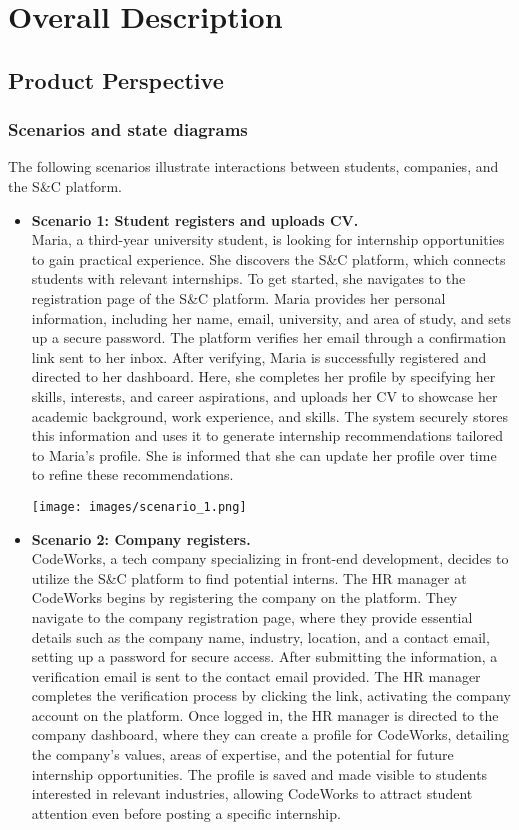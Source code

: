 \section{Overall Description}
\subsection{Product Perspective}


\subsubsection{Scenarios and state diagrams}
The following scenarios illustrate interactions between students, companies, and the S\&C platform.

\begin{itemize}
    \item \textbf{Scenario 1: Student registers and uploads CV.}  \\
    Maria, a third-year university student, is looking for internship opportunities to gain practical experience. She discovers the S\&C platform, which connects students with relevant internships. To get started, she navigates to the registration page of the S\&C platform. Maria provides her personal information, including her name, email, university, and area of study, and sets up a secure password. The platform verifies her email through a confirmation link sent to her inbox. After verifying, Maria is successfully registered and directed to her dashboard. Here, she completes her profile by specifying her skills, interests, and career aspirations, and uploads her CV to showcase her academic background, work experience, and skills. The system securely stores this information and uses it to generate internship recommendations tailored to Maria’s profile. She is informed that she can update her profile over time to refine these recommendations.

    \vspace{7mm}
    \texttt{[image: images/scenario\_1.png]}
    \vspace{7mm}

    \item \textbf{Scenario 2: Company registers.} \\
    CodeWorks, a tech company specializing in front-end development, decides to utilize the S\&C platform to find potential interns. The HR manager at CodeWorks begins by registering the company on the platform. They navigate to the company registration page, where they provide essential details such as the company name, industry, location, and a contact email, setting up a password for secure access. After submitting the information, a verification email is sent to the contact email provided. The HR manager completes the verification process by clicking the link, activating the company account on the platform. Once logged in, the HR manager is directed to the company dashboard, where they can create a profile for CodeWorks, detailing the company's values, areas of expertise, and the potential for future internship opportunities. The profile is saved and made visible to students interested in relevant industries, allowing CodeWorks to attract student attention even before posting a specific internship.


\end{itemize}
